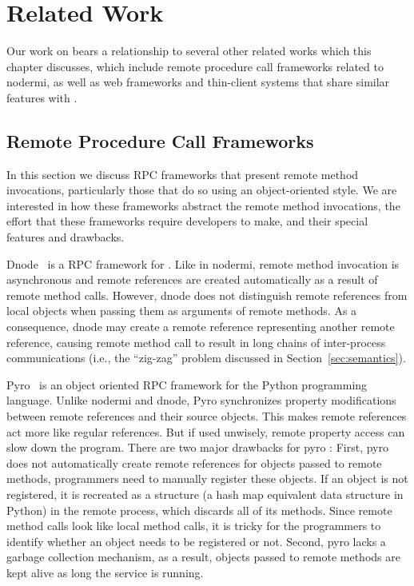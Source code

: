 \chapter{Related Work}

Our work on \cb bears a relationship to several other related works
which this chapter discusses, which include remote procedure call frameworks 
related to nodermi, as well as web frameworks and thin-client systems
that share similar features with \cb.

\section{Remote Procedure Call Frameworks}
\label{sec:relatedrpc}

In this section we discuss RPC frameworks that present remote method
invocations, particularly those that do so using an object-oriented style.  
We are interested in how these
frameworks abstract the remote method invocations, the effort that these
frameworks require developers to make, and their special features and
drawbacks.

Dnode~\cite{dnode} is a RPC framework for \nodejs{}.  Like in nodermi, remote
method invocation is asynchronous and remote references are created automatically
as a result of remote method calls. However, dnode does not distinguish remote
references from local objects when passing them as arguments of remote
methods. As a consequence, dnode may create a remote reference representing
another remote reference,  causing  remote method call to result in long chains
of inter-process communications (i.e., the ``zig-zag'' problem discussed in
Section~\ref{sec:semantics}). 



 
Pyro~\cite{pyro} is an object oriented RPC framework for the Python programming
language. Unlike nodermi and dnode, Pyro synchronizes  property modifications
between remote references and their source objects. This makes remote
references act more like regular references.  But if used unwisely, remote
property access can slow down the program. There are two major drawbacks for
pyro : First, pyro does not automatically create remote references for objects
passed to remote methods, programmers need to manually register these objects.
If an object is not registered, it is recreated as a  structure (a
hash map equivalent data structure in Python) in the remote process, which discards
all of its methods. Since remote method calls look like local method calls, it is
tricky for the programmers to identify whether an object needs to be
registered or not.  Second, pyro lacks a garbage collection mechanism, 
as a result, objects passed to remote methods are kept alive as long the 
service is running.

